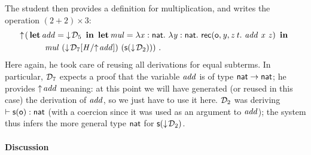 \documentclass{llncs}
\begin{document}
The student then provides a definition for multiplication, and writes
the operation $(2 + 2)\times3$:
\begin{align*}
  \finfer{}(
  &\letb{add}{\fget{\md_5}}
  \letb{mul} { \tlam x {\cst{nat}} \tlam y
    {\cst{nat}} \recb \z {\var y} z t {
      \app{\var{add}}\app{\var x} {\var z}} }
  \\
  &\quad\quad\app{\var{mul}}\app
  {(\fget{\gsubst{\md_7}{\msubst H {\finfer{\var{add}}}}})}
  {(\s{\fget{\md_2}})}
  )
  \ \text{.}
\end{align*}
Here again, he took care of reusing all derivations for equal
subterms. In particular, $\md_7$ expects a proof that the variable
$\var{add}$ is of type $\cst{nat}\to\cst{nat}$; he provides
$\finfer{\var{add}}$ meaning: at this point we will have generated (or
reused in this case) the derivation of $\var{add}$, so we just have to
use it here. $\md_2$ was deriving $\vdash\s\z:\cst{nat}$ (with a
coercion since it was used as an argument to $\var{add}$); the system
thus infers the more general type $\cst{nat}$ for $\s{\fget{\md_2}}$.


\paragraph{Discussion}
\end{document}
